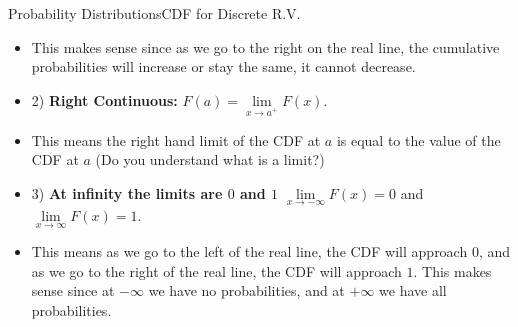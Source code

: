 \documentclass[8pt, usepdftitle = false]{beamer}
\begin{document}
\begin{frame}[allowframebreaks]{Probability Distributions}{CDF for Discrete R.V.}
\begin{itemize}
\begin{itemize}
\item[] This makes sense since as we go to the right on the real line, the cumulative probabilities will increase or stay the same, it cannot decrease. 



\medskip
\item 2) \textbf{Right Continuous:} $F(a)=\lim\limits_{x \rightarrow a^{+}} F(x)$.
\item[] This means the right hand limit of the CDF at $a$ is equal to the value of the CDF at $a$ (Do you understand what is a limit?)


\medskip
\item 3) \textbf{At infinity the limits are $0$ and $1$} $\lim\limits_{x \rightarrow-\infty} F(x)=0$ and  $\lim\limits_{x \rightarrow \infty} F(x)=1$.
\item[] This means as we go to the left of the real line, the CDF will approach $0$, and as we go to the right of the real line, the CDF will approach $1$. This makes sense since at $-\infty$ we have no probabilities, and at $+\infty$ we have all probabilities.



\end{itemize}












\end{itemize}
\end{frame}
\end{document}
